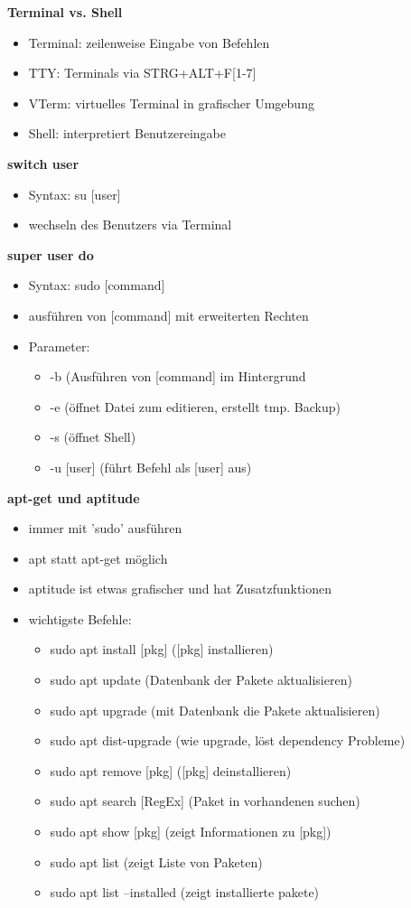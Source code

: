 \documentclass{article}
\begin{document}

\twocolumn
\center
\scriptsize
\textbf{Terminal vs. Shell}
\begin{itemize}
	\item Terminal: zeilenweise Eingabe von Befehlen
	\item TTY: Terminals via STRG+ALT+F[1-7]
	\item VTerm: virtuelles Terminal in grafischer Umgebung
	\item Shell: interpretiert Benutzereingabe
\end{itemize}

\textbf{switch user}
\begin{itemize}
	\item Syntax: su [user]
	\item wechseln des Benutzers via Terminal
\end{itemize}

\textbf{super user do}
\begin{itemize}
	\item Syntax: sudo [command]
	\item ausführen von [command] mit erweiterten Rechten
	\item Parameter:
	\begin{itemize}
		\item -b (Ausführen von [command] im Hintergrund
		\item -e (öffnet Datei zum editieren, erstellt tmp. Backup)
		\item -s (öffnet Shell)
		\item -u [user] (führt Befehl als [user] aus)
	\end{itemize}
\end{itemize}

\textbf{apt-get und aptitude}
\begin{itemize}
	\item immer mit 'sudo' ausführen
	\item apt statt apt-get möglich
	\item aptitude ist etwas grafischer und hat Zusatzfunktionen
	\item wichtigste Befehle:
	\begin{itemize}
		\item sudo apt install [pkg] ([pkg] installieren)
		\item sudo apt update (Datenbank der Pakete aktualisieren)
		\item sudo apt upgrade (mit Datenbank die Pakete aktualisieren)
		\item sudo apt dist-upgrade (wie upgrade, löst dependency Probleme)
		\item sudo apt remove [pkg] ([pkg] deinstallieren)
		\item sudo apt search [RegEx] (Paket in vorhandenen suchen)
		\item sudo apt show [pkg] (zeigt Informationen zu [pkg])
		\item sudo apt list (zeigt Liste von Paketen)
		\item sudo apt list --installed (zeigt installierte pakete)
	\end{itemize}
\end{itemize}
\end{document}
